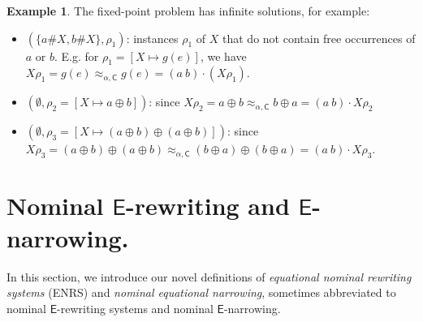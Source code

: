 \documentclass[submission,copyright,creativecommons]{eptcs}
\newcommand{\aleq}{\approx_{\alpha}}
\newcommand{\caleq}{\approx_{\alpha,\theory{C}}}
\newcommand{\alert}[1]{\textcolor{red}{#1}}
\newcommand{\theory}[1]{\ensuremath{\mathsf{#1}}}
\theoremstyle{plain}
\theoremstyle{definition}
\newtheorem{example}{Example}[section]
\theoremstyle{remark}
\begin{document}
\begin{example}
The fixed-point problem has infinite solutions, for example:
\begin{itemize}
    \item $(\{a\#X,b\#X\}, \rho_1)$: instances $\rho_1$ of $X$ that do not contain free occurrences of $a$ or $b$. E.g. for $\rho_1=[X\mapsto g(e)]$, we have  $X\rho_1=g(e) \caleq g(e)= (a\ b) \cdot (X\rho_1) $.
     \item $(\emptyset, \rho_2 
= [X\mapsto a \oplus b])$: since $X\rho_2 = a\oplus b \caleq b \oplus a = (a\ b)\cdot X\rho_2$
    \item $(\emptyset, \rho_3 
= [X\mapsto (a \oplus b)\oplus(a \oplus b)])$: since
$X\rho_3 = (a \oplus b)\oplus(a \oplus b) \caleq (b \oplus a)\oplus(b \oplus a) = (a\ b)\cdot X\rho_3.$ 
\end{itemize}
\end{example}


\section{Nominal \theory{E}-rewriting and \theory{E}-narrowing.} \label{sec:e-rewriting}

In this section, we introduce our novel definitions of {\em equational nominal rewriting systems} (ENRS) and {\em nominal equational narrowing}, sometimes abbreviated to nominal \theory{E}-rewriting systems and nominal \theory{E}-narrowing.
\end{document}

